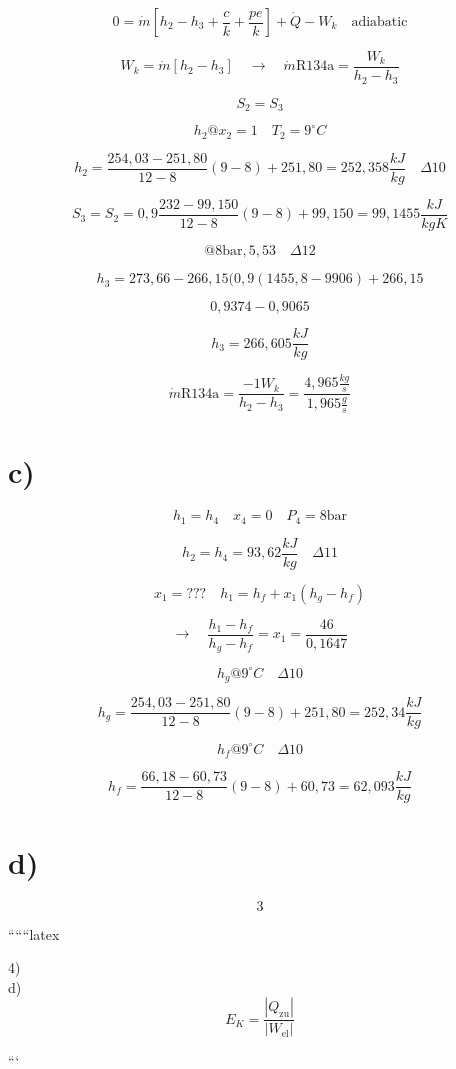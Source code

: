 \[
0 = \dot{m} \left[ h_2 - h_3 + \frac{c}{k} + \frac{pe}{k} \right] + \dot{Q} - W_k \quad \text{adiabatic}
\]

\[
W_k = \dot{m} \left[ h_2 - h_3 \right] \quad \rightarrow \quad \dot{m} \text{R134a} = \frac{W_k}{h_2 - h_3}
\]

\[
S_2 = S_3
\]

\[
h_2 @ x_2 = 1 \quad T_2 = 9^\circ C
\]

\[
h_2 = \frac{254,03 - 251,80}{12 - 8} (9 - 8) + 251,80 = 252,358 \frac{kJ}{kg} \quad \Delta 10
\]

\[
S_3 = S_2 = 0,9 \frac{232 - 99,150}{12 - 8} (9 - 8) + 99,150 = 99,1455 \frac{kJ}{kgK}
\]

\[
@ 8 \text{bar}, 5,53 \quad \Delta 12
\]

\[
h_3 = 273,66 - 266,15 (0,9 (1455,8 - 9906) + 266,15
\]

\[
0,9374 - 0,9065
\]

\[
h_3 = 266,605 \frac{kJ}{kg}
\]

\[
\dot{m} \text{R134a} = \frac{-1 W_k}{h_2 - h_3} = \frac{4,965 \frac{kg}{s}}{1,965 \frac{g}{s}}
\]

\section*{c)}

\[
h_1 = h_4 \quad x_4 = 0 \quad P_4 = 8 \text{bar}
\]

\[
h_2 = h_4 = 93,62 \frac{kJ}{kg} \quad \Delta 11
\]

\[
x_1 = ??? \quad h_1 = h_f + x_1 (h_g - h_f)
\]

\[
\rightarrow \quad \frac{h_1 - h_f}{h_g - h_f} = x_1 = \frac{46}{0,1647}
\]

\[
h_g @ 9^\circ C \quad \Delta 10
\]

\[
h_g = \frac{254,03 - 251,80}{12 - 8} (9 - 8) + 251,80 = 252,34 \frac{kJ}{kg}
\]

\[
h_f @ 9^\circ C \quad \Delta 10
\]

\[
h_f = \frac{66,18 - 60,73}{12 - 8} (9 - 8) + 60,73 = 62,093 \frac{kJ}{kg}
\]

\section*{d)}

\[
\boxed{3}
\]

``````latex

4) \\
d) \\
\[
E_K = \frac{|Q_{\text{zu}}|}{|W_{\text{el}}|}
\]

```
